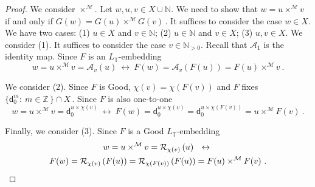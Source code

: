 \documentclass[10pt,a4paper, openany,  oldfontcommands]{memoir}
\newtheorem{open problem} [theorem] {Open Problem}
\newtheorem{open question} [theorem] {Open Question}
\begin{document}
\begin{proof}
We consider  $  \times^{  \mathcal{M}  }  $. 
Let  $  w, u,  v  \in    X  \cup  \mathbb{N}  $. 
We need to show that  $  w  =  u   \times^{  \mathcal{M}  }   v  $  if and only if  $  G(w)  =G(u)     \times^{  \mathcal{M}  }  G(v)   \,   $.
It  suffices to consider the case   $  w  \in  X  $. 
We have two cases:  
(1)  $  u  \in  X  $  and  $  v  \in  \mathbb{N} $; 
(2) $  u  \in  \mathbb{N}  $  and  $  v  \in  X  $; 
(3)  $  u,  v  \in  X  $. 
We consider (1). 
It  suffices to consider the case  $  v  \in \mathbb{N}_{  >  0 }   $.
Recall that  $  \mathcal{A}_1  $ is the identity map.
Since  $F$ is an  $ L_{  \mathbb{T} } $-embedding 
\[
 w  =     u   \times ^{  \mathcal{M}  }   v  =    \mathcal{A}_v  \left(  u \right) 
 \   \leftrightarrow   \    
F ( w )  =
  \mathcal{A}_v  \left(    F(u) \right) 
= 
F(u)  \times^{  \mathcal{M}  }  v
\   . 
\]



We consider (2). 
Since  $F$  is   \textsf{Good}, 
$   \chi \left( v  \right)  =    \chi \left(  F(v)  \right)  $  and  
$F$  fixes  $  \big\{  \mathsf{d}^m_0  :   \   m  \in  \mathbb{Z}  \,   \big\}    \cap  X  \,   $. 
Since  $F$ is also one-to-one 
\[
 w  =     u   \times ^{  \mathcal{M}  }   v  =    \mathsf{d}_0^{  u  \times  \chi \left( v  \right) }   
 \   \leftrightarrow   \    
F ( w )  =   \mathsf{d}_0^{  u  \times  \chi \left( v  \right) }     =  
  \mathsf{d}_0^{  u  \times  \chi \left(   F(v)  \right) }   
= u  \times^{  \mathcal{M}  }    F(v)
\   . 
\]



Finally,  we consider (3). 
Since  $F$ is a  \textsf{Good}  $ L_{  \mathbb{T} } $-embedding 
\begin{multline*}
 w  =     u   \times ^{  \mathcal{M}  }   v  =    \mathcal{R}_{  \chi  \left(  v  \right)  }  \left(  u \right) 
\     \   \leftrightarrow   \    
 \\
F ( w )  =
 \mathcal{R}_{  \chi  \left(  v  \right)  }  \left(   F(u)  \right)   = 
  \mathcal{R}_{  \chi  \left(  F(v)  \right)   } \left(   F(u)  \right)    = 
F(u)  \times^{  \mathcal{M}  }    F(v)
\       .       \qedhere
\end{multline*}
\end{proof}
\end{document}
